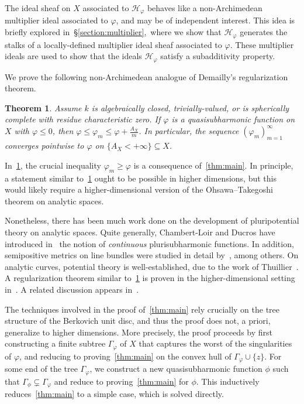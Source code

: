 \documentclass[10pt,reqno]{amsart}
\theoremstyle{plain}
\newtheorem{thmy}{Theorem}
\newenvironment{thmx}{\stepcounter{theorem}\begin{thmy}}{\end{thmy}}
\theoremstyle{definition}
\renewcommand{\H}{\mathcal{H}}
\numberwithin{equation}{section}
\begin{document}
The ideal sheaf on $X$ associated to $\H_{\varphi}$ behaves like a non-Archimedean multiplier ideal associated to $\varphi$, and may be of independent interest. This idea is briefly explored in~\S\ref{section:multiplier},\ where we show that $\H_{\varphi}$ generates the stalks of a locally-defined multiplier ideal sheaf associated to $\varphi$. These multiplier ideals are used to show that the ideals $\H_{\varphi}$ satisfy a subadditivity property. 

We prove the following non-Archimedean analogue of Demailly's regularization theorem.

\begin{thmx}\label{thm:application}
Assume $k$ is algebraically closed, trivially-valued, or is spherically complete with residue characteristic zero. 
If $\varphi$ is a quasisubharmonic function on $X$ with $\varphi \leq 0$, then $\varphi \leq \varphi_m \leq \varphi + \frac{A_X}{m}$. In particular, the sequence $(\varphi_m)_{m=1}^{\infty}$ converges pointwise to $\varphi$ on $\{ A_X < +\infty \} \subseteq X$. 
\end{thmx}

In~\cref{thm:application}, the crucial inequality $\varphi_m \geq \varphi$ is a consequence of~\cref{thm:main}. In principle, a statement similar to~\cref{thm:application} ought to be possible in higher dimensions, but this would likely require a higher-dimensional version of the Ohsawa--Takegoshi theorem on analytic spaces.

Nonetheless, there has been much work done on the development of pluripotential theory on analytic spaces. Quite generally, Chambert-Loir and Ducros have introduced in~\cite{clducros} the notion of \emph{continuous} plurisubharmonic functions. In addition, semipositive metrics on line bundles were studied in detail by~\cite{zhang1995small, gubler1998local}, among others. On analytic curves, potential theory is well-established, due to the work of Thuillier~\cite{thuillier2005theorie}. 
A regularization theorem similar to~\cref{thm:application} is proven in the higher-dimensional setting in~\cite[Theorem B]{bfj16}. A related discussion appears in~\cite[\S 5]{bfj08}. 

The techniques involved in the proof of~\cref{thm:main} rely crucially on the tree structure of the Berkovich unit disc, and thus the proof does not, a priori, generalize to higher dimensions. More precisely, the proof proceeds by first constructing a finite subtree $\Gamma_{\varphi}$ of $X$ that captures the worst of the singularities of $\varphi$, and reducing to proving~\cref{thm:main} on the convex hull of $\Gamma_{\varphi} \cup \{ z \}$. For some end of the tree $\Gamma_{\varphi}$, we construct a new quasisubharmonic function $\phi$ such that $\Gamma_{\phi} \subsetneq \Gamma_{\varphi}$ and reduce to proving~\cref{thm:main} for $\phi$. This inductively reduces~\cref{thm:main} to a simple case, which is solved directly.
\end{document}
